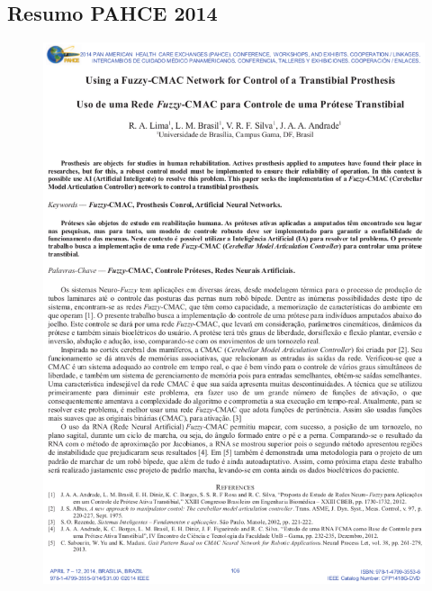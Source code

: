 \begin{apendicesenv}
\chapter{Resumo PAHCE 2014}
\begin{figure}[ht]
		\centering
		\includegraphics[width=17cm]{figuras/pahce2014.eps}
	\label{pahce2014}
	\end{figure}


\end{apendicesenv}







